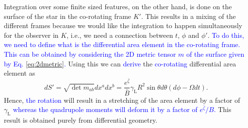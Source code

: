 \documentclass{aa}
\newcommand{\be}{\begin{equation}}
\newcommand{\ee}{\end{equation}}
\newcommand{\refe}[1]{\textcolor{blue}{{#1}}}
\newcommand{\Ob}{\ensuremath{\hat{\Omega}}}
\newcommand{\zetab}{\ensuremath{\bar{\zeta}}}
\newcommand{\Bb}{\ensuremath{\bar{B}}}
\newcommand{\lgamma}{\gamma_{\text{L}}}
\begin{document}
Integration over some finite sized features, on the other hand, is done on the surface of the star in the co-rotating frame $K'$.
This results in a mixing of the different frames because we would like the integration to happen simultaneously for the observer in $K$, i.e., we need a connection between $t$, $\phi$ and $\phi'$.
\refe{To do this, we need to define what is the differential area element in the co-rotating frame.}
\refe{This can be obtained by considering the 2D metric tensor $m$ of the surface given by Eq. \eqref{eq:2dmetric}.}
Using this we can \refe{derive} the \refe{co-rotating} differential area element as
\be\label{eq:dSp}
dS' = \sqrt{\det m_{ab}} dx^a dx^b = \frac{e^{\zetab}}{\Bb} \lgamma R^2 \sin\theta d\theta (d\phi - \Omega dt).
\ee
Hence, \refe{the rotation} will result in a stretching of the area element by a factor of $\lgamma$ \refe{whereas the quadrupole moments will deform it by a factor of $e^{\zetab}/B$.}
This result is obtained purely from differential geometry.
\end{document}
